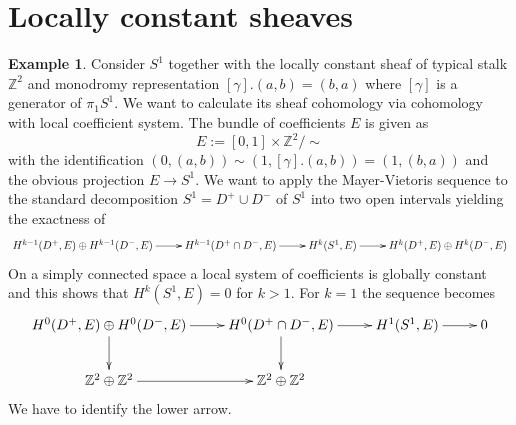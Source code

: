 \documentclass[10pt]{amsart}
\theoremstyle{definition}
\newtheorem{ex}[defn]{Example}
\theoremstyle{plain}
\theoremstyle{remark}
\newcommand{\Z}{\mathbb{Z}}
\newcommand{\union}{\cup}
\newcommand{\intersection}{\cap}
\begin{document}
\section*{Locally constant sheaves}

\begin{ex}\label{twistarsch}
Consider $S^1$ together with the locally constant sheaf of typical stalk $\Z^2$ and monodromy representation $[\gamma].(a,b)=(b,a)$ where $[\gamma]$ is a generator of $\pi_1S^1$. We want to calculate its sheaf cohomology via cohomology with local coefficient system. The bundle of coefficients $E$ is given as $$E:=[0,1]\times\Z^2/\sim$$ with the identification $(0,(a,b))\sim (1,[\gamma].(a,b))=(1,(b,a))$ and the obvious projection $E\to S^1$. We want to apply the Mayer-Vietoris sequence to the standard decomposition $S^1=D^+\union D^-$ of $S^1$ into two open intervals yielding the exactness of
\[\begin{xy}
  \xymatrix{
  H^{k-1}(D^+,E)\oplus H^{k-1}(D^-,E)\ar[r] & H^{k-1}(D^+\intersection D^-,E)\ar[r] & H^k(S^1,E)\ar[r] & H^k(D^+,E)\oplus H^k(D^-,E)
  } 
  \end{xy}\]
On a simply connected space a local system of coefficients is globally constant and this shows that $H^k(S^1,E)=0$ for $k>1$. For $k=1$ the sequence becomes
\begin{align}\label{arsch}
\begin{xy}
  \xymatrix{
  H^0(D^+,E)\oplus H^0(D^-,E)\ar[r]\ar[d] & H^0(D^+\intersection D^-,E)\ar[r]\ar[d] & H^1(S^1,E)\ar[r] & 0\\
  \Z^2\oplus\Z^2\ar[r] & \Z^2\oplus\Z^2 & & 
  }
  \end{xy}
\end{align}
We have to identify the lower arrow.\newline
{}
\end{ex}
\end{document}

